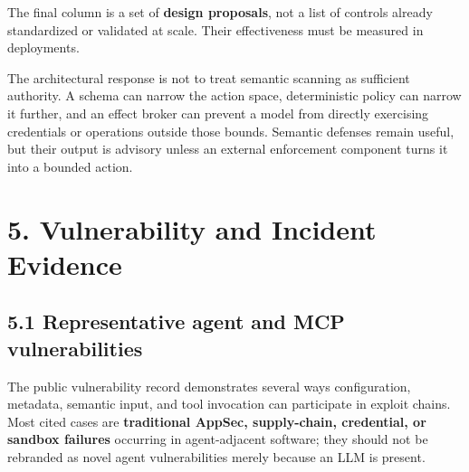 \documentclass[
  10pt,
  letterpaper,
]{article}
\begin{document}
The final column is a set of \textbf{design proposals}, not a list of
controls already standardized or validated at scale. Their effectiveness
must be measured in deployments.

The architectural response is not to treat semantic scanning as
sufficient authority. A schema can narrow the action space,
deterministic policy can narrow it further, and an effect broker can
prevent a model from directly exercising credentials or operations
outside those bounds. Semantic defenses remain useful, but their output
is advisory unless an external enforcement component turns it into a
bounded action.

\section{5. Vulnerability and Incident
Evidence}\label{vulnerability-and-incident-evidence}

\subsection{5.1 Representative agent and MCP
vulnerabilities}\label{representative-agent-and-mcp-vulnerabilities}

The public vulnerability record demonstrates several ways configuration,
metadata, semantic input, and tool invocation can participate in exploit
chains. Most cited cases are \textbf{traditional AppSec, supply-chain,
credential, or sandbox failures} occurring in agent-adjacent software;
they should not be rebranded as novel agent vulnerabilities merely
because an LLM is present.
\end{document}
